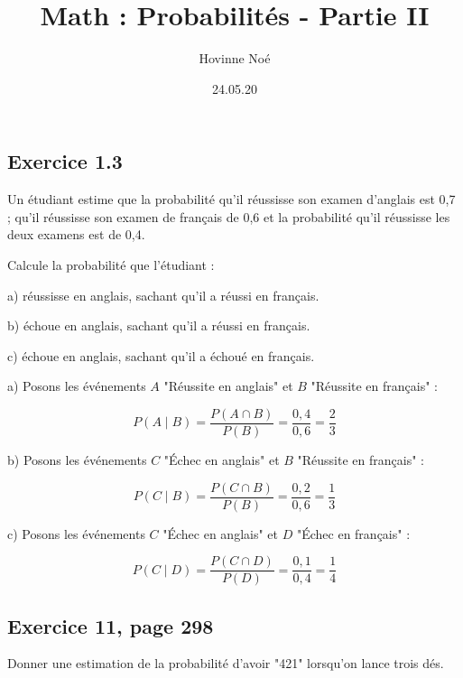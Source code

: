 \documentclass[10pt]{article}
\begin{document}
\title{Math : Probabilités - Partie II}
\author{Hovinne Noé}
\date{24.05.20}
\maketitle
\vspace{1cm}
\subsection*{Exercice 1.3}
Un étudiant estime que la probabilité qu'il réussisse son examen d'anglais est 0,7 ; qu'il réussisse son examen de français de 0,6 et la probabilité qu'il réussisse les deux examens est de 0,4.\vspace{6pt}

Calcule la probabilité que l'étudiant :\vspace{2pt}

\hspace{10pt}a) réussisse en anglais, sachant qu'il a réussi en français.\vspace{1pt}

\hspace{10pt}b) échoue en anglais, sachant qu'il a réussi en français.\vspace{1pt}

\hspace{10pt}c) échoue en anglais, sachant qu'il a échoué en français.\vspace{12pt}

a) Posons les événements $A$ "Réussite en anglais" et $B$ "Réussite en français" :

$$P(A\mid B)=\frac{P(A\cap B)}{P(B)}=\frac{0,4}{0,6}=\frac{2}{3}$$\vspace{1pt}

b) Posons les événements $C$ "Échec en anglais" et $B$ "Réussite en français" :

$$P(C\mid B)=\frac{P(C\cap B)}{P(B)}=\frac{0,2}{0,6}=\frac{1}{3}$$\vspace{1pt}

c) Posons les événements $C$ "Échec en anglais" et $D$ "Échec en français" :

$$P(C\mid D)=\frac{P(C\cap D)}{P(D)}=\frac{0,1}{0,4}=\frac{1}{4}$$

\subsection*{Exercice 11, page 298}
Donner une estimation de la probabilité d'avoir "421" lorsqu'on lance trois dés.\vspace{6pt}
\end{document}

